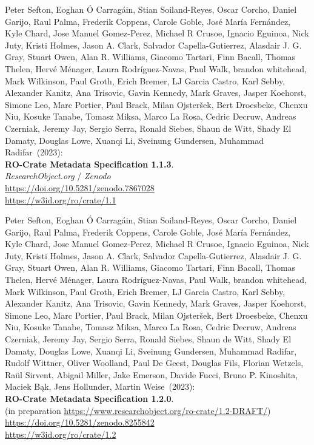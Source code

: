 \begin{thebibliography}{9}
Peter Sefton, Eoghan Ó Carragáin, Stian Soiland-Reyes, Oscar
Corcho, Daniel Garijo, Raul Palma, Frederik Coppens, Carole Goble, José
María Fernández, Kyle Chard, Jose Manuel Gomez-Perez, Michael R Crusoe,
Ignacio Eguinoa, Nick Juty, Kristi Holmes, Jason A. Clark, Salvador
Capella-Gutierrez, Alasdair J. G. Gray, Stuart Owen, Alan R. Williams,
Giacomo Tartari, Finn Bacall, Thomas Thelen, Hervé Ménager, Laura
Rodríguez-Navas, Paul Walk, brandon whitehead, Mark Wilkinson, Paul
Groth, Erich Bremer, LJ Garcia Castro, Karl Sebby, Alexander Kanitz, Ana
Trisovic, Gavin Kennedy, Mark Graves, Jasper Koehorst, Simone Leo, Marc
Portier, Paul Brack, Milan Ojsteršek, Bert Droesbeke, Chenxu Niu, Kosuke Tanabe, Tomasz Miksa, Marco La Rosa, Cedric Decruw, Andreas Czerniak, Jeremy Jay, Sergio Serra, Ronald Siebes, Shaun de Witt, Shady El Damaty, Douglas Lowe, Xuanqi Li, Sveinung Gundersen, Muhammad Radifar~(2023): \\
\textbf{RO-Crate Metadata Specification 1.1.3}.\\
\emph{ResearchObject.org} / \emph{Zenodo}\\
\url{https://doi.org/10.5281/zenodo.7867028}\\
\url{https://w3id.org/ro/crate/1.1}

Peter Sefton, Eoghan Ó Carragáin, Stian Soiland-Reyes, Oscar
Corcho, Daniel Garijo, Raul Palma, Frederik Coppens, Carole Goble, José
María Fernández, Kyle Chard, Jose Manuel Gomez-Perez, Michael R Crusoe,
Ignacio Eguinoa, Nick Juty, Kristi Holmes, Jason A. Clark, Salvador
Capella-Gutierrez, Alasdair J. G. Gray, Stuart Owen, Alan R. Williams,
Giacomo Tartari, Finn Bacall, Thomas Thelen, Hervé Ménager, Laura
Rodríguez-Navas, Paul Walk, brandon whitehead, Mark Wilkinson, Paul
Groth, Erich Bremer, LJ Garcia Castro, Karl Sebby, Alexander Kanitz, Ana
Trisovic, Gavin Kennedy, Mark Graves, Jasper Koehorst, Simone Leo, Marc
Portier, Paul Brack, Milan Ojsteršek, Bert Droesbeke, Chenxu Niu, Kosuke Tanabe, Tomasz Miksa, Marco La Rosa, Cedric Decruw, Andreas Czerniak, Jeremy Jay, Sergio Serra, Ronald Siebes, Shaun de Witt, Shady El Damaty, Douglas Lowe, Xuanqi Li, Sveinung Gundersen, Muhammad Radifar,
Rudolf Wittner, Oliver Woolland, Paul De Geest, Douglas Fils, Florian Wetzels, Raül Sirvent,
Abigail Miller, Jake Emerson, Davide Fucci, Bruno P. Kinoshita, Maciek Bąk,
Jens Hollunder, Martin Weise~(2023): \\
\textbf{RO-Crate Metadata Specification 1.2.0}.\\
(in preparation \url{https://www.researchobject.org/ro-crate/1.2-DRAFT/})\\
\url{https://doi.org/10.5281/zenodo.8255842}\\
\url{https://w3id.org/ro/crate/1.2}


\end{thebibliography}
